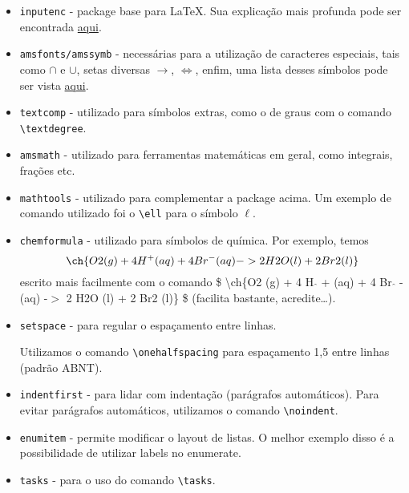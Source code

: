 \documentclass[12pt,a4paper]{article}
\begin{document}
\begin{itemize}

\item \texttt{inputenc} - package base para \LaTeX. Sua explicação mais profunda pode ser encontrada \href{https://ctan.org/pkg/inputenc}{aqui}.
\item \texttt{amsfonts/amssymb} - necessárias para a utilização de caracteres especiais, tais como $\cap$ e $\cup$, setas diversas $\rightarrow$, $\Leftrightarrow$, enfim, uma lista desses símbolos pode ser vista \href{http://milde.users.sourceforge.net/LUCR/Math/mathpackages/amssymb-symbols.pdf}{aqui}.

\item \texttt{textcomp} - utilizado para símbolos extras, como o de graus \textdegree  com o comando \texttt{\textbackslash textdegree}.

\item \texttt{amsmath} - utilizado para ferramentas matemáticas em geral, como integrais, frações etc.
\item \texttt{mathtools} - utilizado para complementar a package acima. Um exemplo de comando utilizado foi o \texttt{\textbackslash ell} para o símbolo $\ell$.

\item \texttt{chemformula} - utilizado para símbolos de química. Por exemplo, temos $$\ch{O2 (g) + 4 H^+ (aq) + 4 Br^- (aq) -> 2 H2O (l) + 2 Br2 (l)}$$ escrito mais facilmente com o comando \$ \textbackslash ch\{O2 (g) + 4 H $\widehat{ }$ + (aq) + 4 Br $\widehat{ }$ - (aq) -$>$ 2 H2O (l) + 2 Br2 (l)\} \$ (facilita bastante, acredite\dots).

\item \texttt{setspace} - para regular o espaçamento entre linhas.

Utilizamos o comando \texttt{\textbackslash onehalfspacing} para espaçamento 1,5 entre linhas (padrão ABNT).

\item \texttt{indentfirst} - para lidar com indentação (parágrafos automáticos). Para evitar parágrafos automáticos, utilizamos o comando \texttt{\textbackslash noindent}.

\item \texttt{enumitem} - permite modificar o layout de listas. O melhor exemplo disso é a possibilidade de utilizar labels no enumerate.

\item \texttt{tasks} - para o uso do comando \texttt{\textbackslash tasks}.


\end{itemize}
\end{document}
